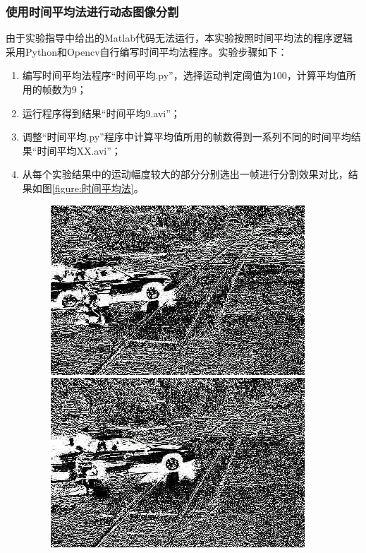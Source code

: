\documentclass[a4paper]{ctexart}
\begin{document}
\subsubsection{使用时间平均法进行动态图像分割}
由于实验指导中给出的Matlab代码无法运行，本实验按照时间平均法的程序逻辑采用Python和Opencv自行编写时间平均法程序。实验步骤如下：
\begin{enumerate}[label=\arabic*、]
	\item 编写时间平均法程序“时间平均.py”，选择运动判定阈值为100，计算平均值所用的帧数为9；
	\item 运行程序得到结果“时间平均9.avi”；
	\item 调整“时间平均.py”程序中计算平均值所用的帧数得到一系列不同的时间平均结果“时间平均XX.avi”；
	\item 从每个实验结果中的运动幅度较大的部分分别选出一帧进行分割效果对比，结果如图\ref{figure:时间平均法}。
	\begin{figure}[htbp]
		\centering
		\begin{minipage}[t]{0.2\textwidth}
			\centering
			\includegraphics[width=\textwidth]{figure/frames/avg9400.jpg}
		\end{minipage}
		\begin{minipage}[t]{0.2\textwidth}
			\centering
			\includegraphics[width=\textwidth]{figure/frames/avg9405.jpg}

\end{minipage}
\end{figure}
\end{enumerate}
\end{document}
